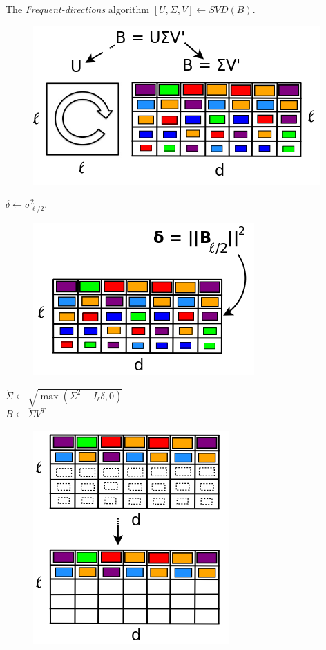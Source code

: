 \documentclass[first=dgreen,second=purple,logo=redque]{aaltoslides}
\begin{document}
\begin{frame}[allowframebreaks=1]{The \textit{Frequent-directions} algorithm}
\framebreak
$[U,\Sigma,V] \leftarrow SVD(B)$. 
\begin{figure}
  \includegraphics[scale=0.45]{plots/fd3}
 \label{fig:fd3}
\end{figure}

\framebreak
$\delta \leftarrow \sigma_{\ell/2}^2$.\\
\begin{figure}
  \includegraphics[scale=0.4]{plots/fd4}
 \label{fig:fd4}
\end{figure}

\framebreak
$\check{\Sigma} \leftarrow \sqrt{\max(\Sigma^2-I_\ell\delta,0)}$\\
$B\leftarrow \check{\Sigma}V^T$
\begin{figure}
  \includegraphics[scale=0.375]{plots/fd5}
 \label{fig:fd5}
\end{figure}  


\end{frame}
\end{document}
